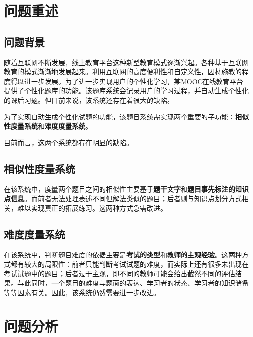 \setcounter{page}{1}    %

%
%

\section{问题重述}

\subsection{问题背景}

随着互联网不断发展，线上教育平台这种新型教育模式逐渐兴起。各种基于互联网教育的模式渐渐地发展起来。利用互联网的高度便利性和自定义性，因材施教的程度得以进一步发展。为了进一步实现用户的个性化学习，某\linebreak MOOC在线教育平台提供了个性化题库的功能。该题库系统会记录用户的学习过程，并自动生成个性化的课后习题。但目前来说，该系统还存在着很大的缺陷。

为了实现自动生成个性化试题的功能，该题目系统需实现两个重要的子功能：\textbf{相似性度量系统}和\textbf{难度度量系统}。

目前而言，这两个系统都存在明显的缺陷。

\subsection{相似性度量系统}

在该系统中，度量两个题目之间的相似性主要基于\textbf{题干文字}和\textbf{题目事先标注的知识点信息}。而前者无法处理表述不同但解法类似的题目；后者则与知识点划分方式相关，难以实现真正的拓展练习。这两种方式急需改进。

\subsection{难度度量系统}

在该系统中，判断题目难度的依据主要是\textbf{考试的类型}和\textbf{教师的主观经验}。这两种方式都有较大的局限性：前者只能判断考试试题的难度，而实际上还有很多未出现在考试试题中的题目；后者过于主观，即不同的教师可能会给出截然不同的评估结果。与此同时，一个题目的难度与题面的表达、学习者的状态、学习者的知识储备等等因素有关。因此，该系统仍然需要进一步改进。

\section{问题分析}

